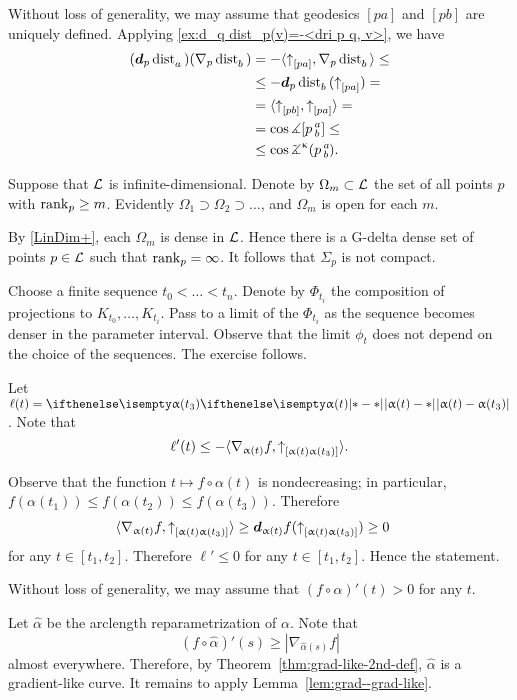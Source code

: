 Without loss of generality, we may assume that geodesics $[pa]$ and $[pb]$ are uniquely defined.
Applying \ref{ex:d_q dist_p(v)=-<dri p q, v>}, we have
\begin{align*}(\dd_p\distfun{a}{}{})(\nabla_p\distfun{b}{}{})&=-\langle\dir pa,\nabla_p\distfun{b}{}{} \rangle\le
\\
&\le -\dd_p\distfun{b}{}{}(\dir pa)=
\\
&=\langle\dir pb, \dir pa\rangle=
\\
&= \cos\mangle\hinge p a b \le 
\\
&\le \cos\angk\kappa p a b.
\end{align*}


Suppose that $\mathcal{L}$ is infinite-dimensional.
Denote by $\Omega_m\subset \spc{L}$ the set of all points $p$ with $\rank_p\ge m$.
Evidently $\Omega_1\supset \Omega_2\supset\dots$, and $\Omega_m$ is open for each $m$.

By \ref{LinDim+}, each $\Omega_m$ is dense in $\mathcal{L}$.
Hence there is a G-delta dense set of points $p\in\spc{L}$ such that $\mathop{\rm rank}\nolimits_p=\infty$.
It follows that $\Sigma_p$ is not compact.

Choose a finite sequence $t_0<\dots<t_n$.
Denote by $\Phi_{t_i}$ the composition of projections to $K_{t_0},\dots, K_{t_i}$.
Pass to a limit of the $\Phi_{t_i}$ as the sequence becomes denser in the parameter interval. Observe that the limit $\phi_t$ does not depend on the choice of the sequences. The exercise follows. 


Let $\ell(t)=\dist{\alpha(t)}{\alpha(t_3)}{}$.
Note that 
\[\ell'(t)\le -\langle \nabla_{\alpha(t)}f,\dir{\alpha(t)}{\alpha(t_3)}\rangle.\]

Observe that the function $t\mapsto f\circ\alpha(t)$ is nondecreasing;
in particular, $f(\alpha(t_1))\le f(\alpha(t_2))\le f(\alpha(t_3))$.
Therefore 
\begin{align*}\langle \nabla_{\alpha(t)}f,\dir{\alpha(t)}{\alpha(t_3)}\rangle&\ge\dd_{\alpha(t)}f(\dir{\alpha(t)}{\alpha(t_3)})\ge 0
\end{align*}
for any $t\in[t_1,t_2]$.
Therefore $\ell'\le 0$ for any $t\in[t_1,t_2]$.
Hence the statement.

Without loss of generality, we may assume that $(f\circ\alpha)'(t)>0$ for any $t$.

Let $\hat\alpha$ be the arclength reparametrization of $\alpha$.
Note that 
\[(f\circ\hat\alpha)'(s)\ge |\nabla_{\hat\alpha(s)}f|\]
almost everywhere.
Therefore, by Theorem~\ref{thm:grad-like-2nd-def}, $\hat\alpha$ is a gradient-like curve.
It remains to apply Lemma~\ref{lem:grad--grad-like}.

